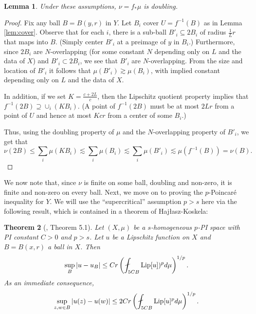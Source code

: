 \documentclass{amsart}
\theoremstyle{plain}
\newtheorem{theorem}{Theorem}
\newtheorem{lemma}[theorem]{Lemma}
\theoremstyle{definition}
\numberwithin{equation}{section}
\numberwithin{theorem}{section}
\newcommand{\Lip}{\textnormal{Lip}}
\begin{document}
\begin{lemma}\label{lem:doubling}
Under these assumptions, $\nu=f_*\mu$ is doubling.
\end{lemma}
\begin{proof}
Fix any ball $B=B(y,r)$ in $Y$. Let $B_i$ cover $U=f^{-1}(B)$ as in Lemma \ref{lem:cover}. Observe that for each $i$, there is a sub-ball $B'_i\subseteq 2B_i$ of radius $\frac1L r$ that maps into $B$. (Simply center $B'_i$ at a preimage of $y$ in $B_i$.) Furthermore, since $2B_i$ are $N$-overlapping (for some constant $N$ depending only on $L$ and the data of $X$) and $B'_i \subset 2B_i$, we see that $B'_i$ are $N$-overlapping. From the size and location of $B'_i$ it follows that $\mu(B'_i) \gtrsim \mu(B_i)$, with implied constant depending only on $L$ and the data of $X$.

In addition, if we set $K = \frac{c+2L}{c}$, then the Lipschitz quotient property implies that  $f^{-1}(2B) \supseteq \cup_i (KB_i)$. (A point of $f^{-1}(2B)$ must be at most $2Lr$ from a point of $U$ and hence at most $Kcr$ from a center of some $B_i$.)

Thus, using the doubling property of $\mu$ and the $N$-overlapping property of $B'_i$, we get that
$$ \nu(2B) \leq \sum_i \mu(KB_i) \lesssim \sum_i \mu(B_i) \lesssim \sum_i \mu(B'_i) \lesssim \mu(f^{-1}(B)) =  \nu(B).$$
\end{proof}

We now note that, since $\nu$ is finite on some ball, doubling and non-zero, it is finite and non-zero on every ball. Next, we move on to proving the $p$-Poincar\'e inequality for $Y$. We will use the ``supercritical'' assumption $p>s$ here via the following result, which is contained in a theorem of Haj\l asz-Koskela:
\begin{theorem}[\cite{HajlaszKoskela}, Theorem 5.1]\label{thm:HK}
Let $(X,\mu)$ be a $s$-homogeneous $p$-PI space with PI constant $C>0$ and $p>s$. Let $u$ be a Lipschitz function on $X$ and $B=B(x,r)$ a ball in $X$. Then
$$ \sup_B |u-u_B| \leq Cr\left(\fint_{5CB} \Lip[u])^p d\mu\right)^{1/p}.$$
As an immediate consequence,
$$ \sup_{z,w\in B}  |u(z)-u(w)| \leq 2Cr\left(\fint_{5CB} \Lip[u]^p d\mu\right)^{1/p}.$$
\end{theorem}
\end{document}
